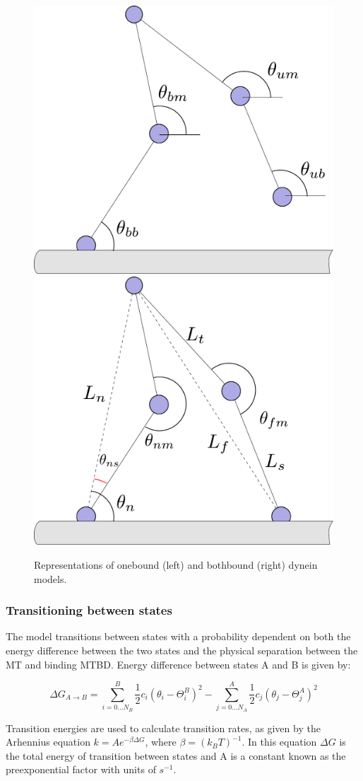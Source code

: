 \documentclass[10pt]{article} %
\begin{document}
\begin{figure}[h]
  \centering
  \includegraphics[width=.45\textwidth]{../../figures/code-onebound}
  \includegraphics[width=.45\textwidth]{../../figures/code-bothbound}
  \caption{Representations of onebound (left) and bothbound (right) dynein models.}
  \label{ob_fig}
\end{figure}

\subsubsection{Transitioning between states}
The model transitions between states with a probability dependent on both the energy difference between the two states and the physical separation between the MT and binding MTBD. Energy difference between states A and B is given by:

\begin{equation}
  \Delta G_{A\rightarrow B} = \sum_{i=0...N_B}^{B} \frac{1}{2}c_i\left(\theta_i-\Theta_i^B\right)^2 - \sum_{j=0...N_A}^{A} \frac{1}{2}c_j\left(\theta_j-\Theta_j^A\right)^2
\end{equation}

Transition energies are used to calculate transition rates, as given by the Arhennius equation $k=Ae^{-\beta\Delta G}$, where $\beta = (k_BT)^{-1}$. In this equation $\Delta G$ is the total energy of transition between states and A is a constant known as the preexponential factor with units of $s^{-1}$.\\
\end{document}

